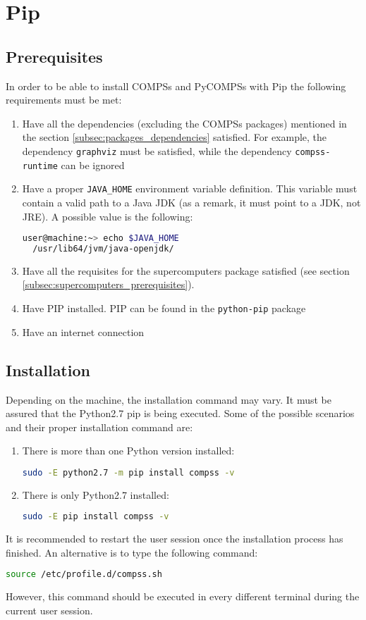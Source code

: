 \section{Pip}
\label{sec:Pip}

\subsection{Prerequisites}
\label{subsec:pip_prerequisites}
In order to be able to install COMPSs and PyCOMPSs with Pip the following requirements must be met:
\begin{enumerate}
 \item Have all the dependencies (excluding the COMPSs packages) mentioned in the section \ref{subsec:packages_dependencies} satisfied. For example, the dependency \verb|graphviz|
 must be satisfied, while the dependency \verb|compss-runtime| can be ignored
 \item Have a proper \verb|JAVA_HOME| environment variable definition. This variable must contain a valid path to a Java JDK (as a remark, it must point to a JDK, not JRE). A possible value is the following:
 \begin{lstlisting}[language=bash]
  user@machine:~> echo $JAVA_HOME
  /usr/lib64/jvm/java-openjdk/\end{lstlisting}

 \item Have all the requisites for the supercomputers package satisfied (see section \ref{subsec:supercomputers_prerequisites}).
 \item Have PIP installed. PIP can be found in the \verb|python-pip| package
 \item Have an internet connection
\end{enumerate}
\subsection{Installation}
\label{subsec:pip_installation}
Depending on the machine, the installation command may vary. It must be assured that the Python2.7 pip is being executed. Some of the possible scenarios and their proper installation command are:
\begin{enumerate}
 \item There is more than one Python version installed:
 \begin{lstlisting}[language=bash]
 sudo -E python2.7 -m pip install compss -v\end{lstlisting}
 \item There is only Python2.7 installed:
 \begin{lstlisting}[language=bash]
 sudo -E pip install compss -v \end{lstlisting}
\end{enumerate}
It is recommended to restart the user session once the installation process has finished. An alternative is to type the following command:
\begin{lstlisting}[language=bash]
source /etc/profile.d/compss.sh\end{lstlisting}
However, this command should be executed in every different terminal during the current user session.
